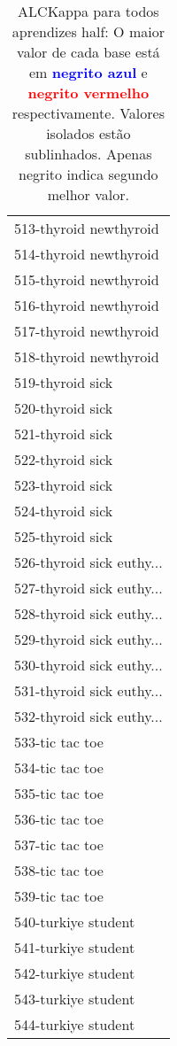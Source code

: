 \begin{table}[h]
\caption{ALCKappa para todos aprendizes half: O maior valor de cada base está em \textcolor{blue}{\textbf{negrito azul}} e \textcolor{red}{\textbf{negrito vermelho}} respectivamente. Valores isolados estão sublinhados. Apenas negrito indica segundo melhor valor.}
\begin{center}\begin{tabular}{l}
 & \\ \hline 513-thyroid newthyroid &  \\
514-thyroid newthyroid &  \\
515-thyroid newthyroid &  \\
516-thyroid newthyroid &  \\
517-thyroid newthyroid &  \\
518-thyroid newthyroid &  \\
519-thyroid sick &  \\ \hline
520-thyroid sick &  \\
521-thyroid sick &  \\
522-thyroid sick &  \\
523-thyroid sick &  \\
524-thyroid sick &  \\
525-thyroid sick &  \\
526-thyroid sick euthy... &  \\ \hline
527-thyroid sick euthy... &  \\
528-thyroid sick euthy... &  \\
529-thyroid sick euthy... &  \\
530-thyroid sick euthy... &  \\
531-thyroid sick euthy... &  \\
532-thyroid sick euthy... &  \\
533-tic tac toe &  \\ \hline
534-tic tac toe &  \\
535-tic tac toe &  \\
536-tic tac toe &  \\
537-tic tac toe &  \\
538-tic tac toe &  \\
539-tic tac toe &  \\
540-turkiye student &  \\ \hline
541-turkiye student &  \\
542-turkiye student &  \\
543-turkiye student &  \\
544-turkiye student &  \\\end{tabular}\label{stratsALCKappa16AllReduxHalfb}
\end{center}
\end{table}
